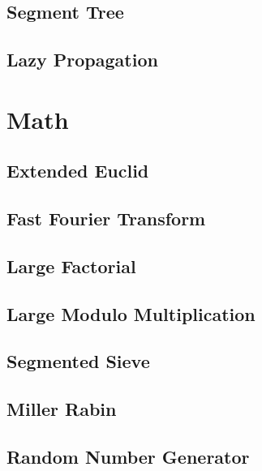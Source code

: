 \subsection{Segment Tree}
\raggedbottom
\hrulefill
\subsection{Lazy Propagation}
\raggedbottom
\hrulefill

\section{Math}
\subsection{Extended Euclid}
\raggedbottom
\hrulefill
\subsection{Fast Fourier Transform}
\raggedbottom
\hrulefill
\subsection{Large Factorial}
\raggedbottom
\hrulefill
\subsection{Large Modulo Multiplication}
\raggedbottom
\hrulefill
\subsection{Segmented Sieve}
\raggedbottom
\hrulefill
\subsection{Miller Rabin}
\raggedbottom
\hrulefill
\subsection{Random Number Generator}
\raggedbottom
\hrulefill

